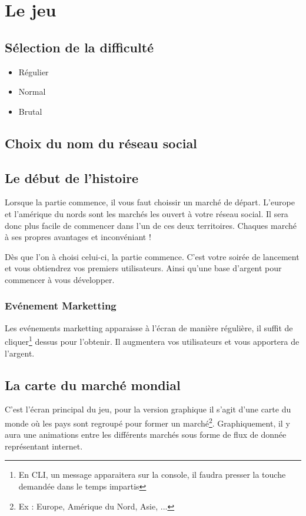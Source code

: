 \section{Le jeu}

\subsection{Sélection de la difficulté}
\begin{itemize}
    \item Régulier
    \item Normal
    \item Brutal
\end{itemize}
\subsection{Choix du nom du réseau social}
\subsection{Le début de l'histoire}
Lorsque la partie commence, il vous faut choissir un marché de départ. L'europe et l'amérique du nords sont les marchés les ouvert à votre réseau social. Il sera donc plus facile de commencer dans l'un de ces deux territoires. Chaques marché à ses propres avantages et inconvéniant !

Dès que l'on à choisi celui-ci, la partie commence. C'est votre soirée de lancement et vous obtiendrez vos premiers utilisateurs. Ainsi qu'une base d'argent pour commencer à vous développer.

\subsubsection{Evénement Marketting}
Les evénements marketting apparaisse à l'écran de manière régulière, il suffit de cliquer\footnote{En CLI, un message apparaitera sur la console, il faudra presser la touche demandée dans le temps impartis} dessus pour l'obtenir. Il augmentera vos utilisateurs et vous apportera de l'argent.

\subsection{La carte du marché mondial}
C'est l'écran principal du jeu, pour la version graphique il s'agit d'une carte du monde où les pays sont regroupé pour former un marché\footnote{Ex : Europe, Amérique du Nord, Asie, ...}. Graphiquement, il y aura une animations entre les différents marchés sous forme de flux de donnée représentant internet.



